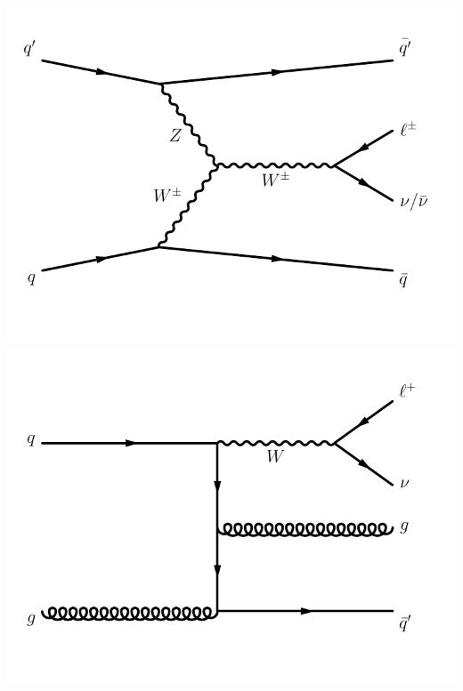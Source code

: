 \documentclass[aspectratio=169,xcolor=dvipsnames,,table,compress]{beamer}
\begin{document}
\begin{frame}
\begin{columns}[T]
\begin{column}{0.33\textwidth}
      \includegraphics[width=\textwidth]{../figures/vbf/diagrams/vbf_w.pdf} \\
      \includegraphics[width=\textwidth]{../figures/vbf/diagrams/qcd_w.pdf} 
    \end{column}
  \end{columns}
\end{frame}
\end{document}
